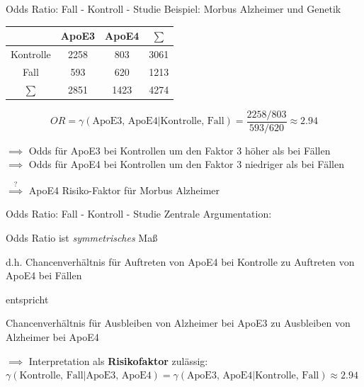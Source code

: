 \documentclass[
  10pt,
  ignorenonframetext,
]{beamer}
\begin{document}
\begin{frame}{Odds Ratio: Fall - Kontroll - Studie}
\protect\hypertarget{odds-ratio-fall---kontroll---studie}{}
Beispiel: Morbus Alzheimer und Genetik

\vspace{0.5cm}

\begin{tabular}{c| cc | c}
  & ApoE3 & ApoE4 & $\sum$ \\ \hline
  Kontrolle & 2258 & 803 & 3061 \\ 
  Fall & 593 & 620 & 1213 \\ \hline
  $\sum$ & 2851 & 1423 & 4274 \\ 
\end{tabular}

\vspace{0.5cm}

\begin{equation*}
  OR = \gamma(\text{ApoE3, ApoE4}|\text{Kontrolle, Fall}) = \frac{2258/803}{593/620} \approx 2.94
\end{equation*}

\vspace{0.5cm}

\(\implies\) Odds für ApoE3 bei Kontrollen um den Faktor 3 höher als bei
Fällen\\
\(\implies\) Odds für ApoE4 bei Kontrollen um den Faktor 3 niedriger als
bei Fällen

\vspace{0.3cm}

\(\stackrel{?}{\implies}\) ApoE4 Risiko-Faktor für Morbus Alzheimer
\end{frame}

\begin{frame}{Odds Ratio: Fall - Kontroll - Studie}
\protect\hypertarget{odds-ratio-fall---kontroll---studie-1}{}
Zentrale Argumentation:

\vspace{0.5cm}

Odds Ratio ist \emph{symmetrisches} Maß

d.h. Chancenverhältnis für Auftreten von ApoE4 bei Kontrolle zu
Auftreten von ApoE4 bei Fällen

\vspace{0.2cm}

entspricht \vspace{0.2cm}

Chancenverhältnis für Ausbleiben von Alzheimer bei ApoE3 zu Ausbleiben
von Alzheimer bei ApoE4

\vspace{0.5cm}

\(\implies\) Interpretation als \textbf{Risikofaktor} zulässig:\\
\(\gamma(\text{Kontrolle, Fall}|\text{ApoE3, ApoE4}) = \gamma(\text{ApoE3, ApoE4}|\text{Kontrolle, Fall}) \approx 2.94\)
\end{frame}
\end{document}
